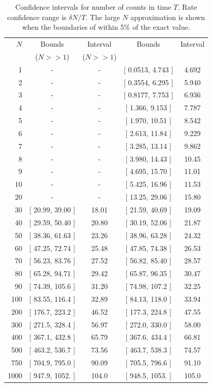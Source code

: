 \documentclass{article}
\begin{document}
\begin{table}
    \begin{tabular}{r|c|c|c|c}
     \hline
$N$ & Bounds  & Interval & Bounds & Interval \\ 
 & ($N>>1$) &  ($N>>1$) &  &  \\ 
\hline 
1 & - & - & [ 0.0513, 4.743 ] & 4.692\\ 
2 & - & - & [ 0.3554, 6.295 ] & 5.940\\ 
3 & - & - & [ 0.8177, 7.753 ] & 6.936\\ 
4 & - & - & [ 1.366, 9.153 ] & 7.787\\ 
5 & - & - & [ 1.970, 10.51 ] & 8.542\\ 
6 & - & - & [ 2.613, 11.84 ] & 9.229\\ 
7 & - & - & [ 3.285, 13.14 ] & 9.862\\ 
8 & - & - & [ 3.980, 14.43 ] & 10.45\\ 
9 & - & - & [ 4.695, 15.70 ] & 11.01\\ 
10 & - & - & [ 5.425, 16.96 ] & 11.53\\ 
20 & - & - & [ 13.25, 29.06 ] & 15.80\\ 
30 & [ 20.99, 39.00 ] & 18.01 & [ 21.59, 40.69 ] & 19.09\\ 
40 & [ 29.59, 50.40 ] & 20.80 & [ 30.19, 52.06 ] & 21.87\\ 
50 & [ 38.36, 61.63 ] & 23.26 & [ 38.96, 63.28 ] & 24.32\\ 
60 & [ 47.25, 72.74 ] & 25.48 & [ 47.85, 74.38 ] & 26.53\\ 
70 & [ 56.23, 83.76 ] & 27.52 & [ 56.82, 85.40 ] & 28.57\\ 
80 & [ 65.28, 94.71 ] & 29.42 & [ 65.87, 96.35 ] & 30.47\\ 
90 & [ 74.39, 105.6 ] & 31.20 & [ 74.98, 107.2 ] & 32.25\\ 
100 & [ 83.55, 116.4 ] & 32.89 & [ 84.13, 118.0 ] & 33.94\\ 
200 & [ 176.7, 223.2 ] & 46.52 & [ 177.3, 224.8 ] & 47.55\\ 
300 & [ 271.5, 328.4 ] & 56.97 & [ 272.0, 330.0 ] & 58.00\\ 
400 & [ 367.1, 432.8 ] & 65.79 & [ 367.6, 434.4 ] & 66.81\\ 
500 & [ 463.2, 536.7 ] & 73.56 & [ 463.7, 538.3 ] & 74.57\\ 
750 & [ 704.9, 795.0 ] & 90.09 & [ 705.5, 796.6 ] & 91.10\\ 
1000 & [ 947.9, 1052. ] & 104.0 & [ 948.5, 1053. ] & 105.0\\ 
\hline
\end{tabular}
\caption{Confidence intervals for number of counts in time $T$.  Rate confidence range is $\delta N/T$.  The large $N$ approximation is shown when the boundaries of within 5\% of the exact value.}
\label{tab:conf}
\end{table}
\end{document}

